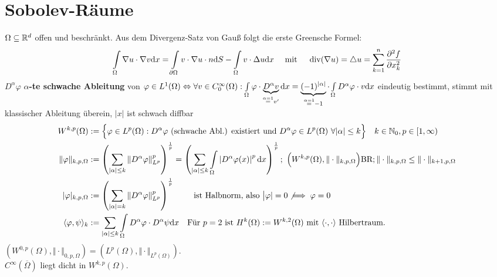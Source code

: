 \documentclass[12pt]{scrartcl}
\begin{document}
	\section{Sobolev-Räume}
	
	$\Omega\subseteq\mathbb{R}^d$ offen und beschränkt.
	Aus dem Divergenz-Satz von Gauß folgt die erste Greensche Formel:
	\begin{align}\label{eqGreen}
		\int\limits_\Omega\nabla u\cdot\nabla v\mathrm{d} x
		=\int\limits_{\partial\Omega}v\cdot\nabla u\cdot n\mathrm{d} S-\int\limits_\Omega v\cdot\Delta u\mathrm{d} x\quad\text{ mit }\quad
		\operatorname{div}(\nabla u)=\triangle u=\sum\limits_{k=1}^n\frac{\partial^2 f}{\partial x_k^2}
	\end{align}
	$D^\alpha\varphi$ \textbf{$\alpha$-te schwache Ableitung} von $\varphi\in L^1(\Omega)\Leftrightarrow
		\forall v\in C_0^\infty(\Omega):\int\limits_\Omega\varphi\cdot \underbrace{D^\alpha v}_{\overset{\alpha=1}=v'}\mathrm{d} x
		=\underbrace{(-1)^{|\alpha|}}_{\overset{\alpha=1}{=}-1}\cdot\int\limits_\Omega D^\alpha\varphi\cdot v\mathrm{d} x$
	eindeutig bestimmt, stimmt mit klassischer Ableitung überein, $|x|$ ist schwach diffbar
	\begin{align*}
		W^{k,p}(\Omega)
		&:=\Big\lbrace\varphi\in L^p(\Omega):D^\alpha\varphi\text{ (schwache Abl.) existiert und }D^\alpha\varphi\in L^p(\Omega)~\forall|\alpha|\leq k\Big\rbrace
		\quad k\in\mathbb{N}_0,p\in[1,\infty)\\
		\Vert\varphi\Vert_{k,p,\Omega}
		&:=\left(\sum\limits_{|\alpha|\leq k}\left\Vert D^\alpha\varphi\right\Vert^p_{L^p}\right)^{\frac{1}{p}}
		=\left(\sum\limits_{|\alpha|\leq k}\int\limits_\Omega\left| D^\alpha\varphi(x)\right|^p\mathrm{d} x\right)^{\frac{1}{p}};~\Big(W^{k,p}(\Omega),\Vert\cdot\Vert_{k,p,\Omega}\Big)\text{BR};\Vert\cdot\Vert_{k,p,\Omega}\leq\Vert\cdot\Vert_{k+1,p,\Omega}\\
		|\varphi|_{k,p,\Omega}
		&:=\left(\sum\limits_{|\alpha|= k}\left\Vert D^\alpha\varphi\right\Vert^p_{L^p}\right)^{\frac{1}{p}}\qquad\text{ ist Halbnorm, also }\big|\varphi|=0\not\implies\varphi=0\\
		\langle \varphi,\psi\rangle_k&:=\sum\limits_{|\alpha|\leq k}\int\limits_\Omega D^\alpha\varphi\cdot D^\alpha\psi\mathrm{d} x\quad\text{Für $p=2$ ist $H^k(\Omega):=W^{k,2}(\Omega)$ mit $\langle\cdot,\cdot\rangle$ Hilbertraum.}
	\end{align*}
	$(W^{0,p}(\Omega),\Vert\cdot\Vert_{0,p,\Omega})=(L^p(\Omega),\Vert\cdot\Vert_{L^p(\Omega)})$.\\
	$C^\infty(\overline{\Omega})$ liegt dicht in $W^{k,p}(\Omega)$.
\end{document}
